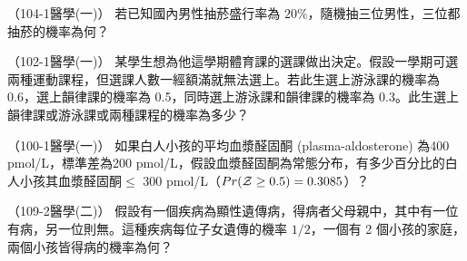     \begin{docexam}{（104-1醫學(一)）}
        若已知國內男性抽菸盛行率為 $20\%$，隨機抽三位男性，三位都抽菸的機率為何？
    \end{docexam}

    \begin{docexam}{（102-1醫學(一)）}
        某學生想為他這學期體育課的選課做出決定。假設一學期可選兩種運動課程，但選課人數一經額滿就無法選上。若此生選上游泳課的機率為 0.6，選上韻律課的機率為 0.5，同時選上游泳課和韻律課的機率為 0.3。此生選上韻律課或游泳課或兩種課程的機率為多少？
    \end{docexam}

    \begin{docexam}{（100-1醫學(一)）}
        如果白人小孩的平均血漿醛固酮 (plasma-aldosterone) 為400 pmol/L，標準差為200 pmol/L，假設血漿醛固酮為常態分布，有多少百分比的白人小孩其血漿醛固酮$\le$ 300 pmol/L（$Pr(\mathcal{Z} \ge 0.5) = 0.3085$）？
    \end{docexam}

    \begin{docexam}{（109-2醫學(二)）}
        假設有一個疾病為顯性遺傳病，得病者父母親中，其中有一位有病，另一位則無。這種疾病每位子女遺傳的機率 $1/2$，一個有 2 個小孩的家庭，兩個小孩皆得病的機率為何？
    \end{docexam}